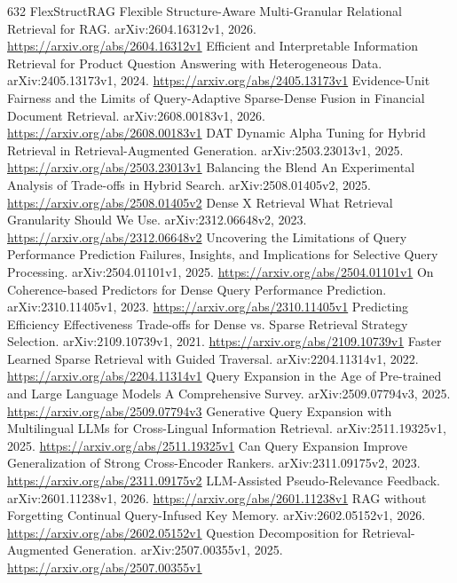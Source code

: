 \documentclass[11pt]{article}
\begin{document}
\begin{thebibliography}{632}
 FlexStructRAG Flexible Structure-Aware Multi-Granular Relational Retrieval for RAG. arXiv:2604.16312v1, 2026. \url{https://arxiv.org/abs/2604.16312v1}
 Efficient and Interpretable Information Retrieval for Product Question Answering with Heterogeneous Data. arXiv:2405.13173v1, 2024. \url{https://arxiv.org/abs/2405.13173v1}
 Evidence-Unit Fairness and the Limits of Query-Adaptive Sparse-Dense Fusion in Financial Document Retrieval. arXiv:2608.00183v1, 2026. \url{https://arxiv.org/abs/2608.00183v1}
 DAT Dynamic Alpha Tuning for Hybrid Retrieval in Retrieval-Augmented Generation. arXiv:2503.23013v1, 2025. \url{https://arxiv.org/abs/2503.23013v1}
 Balancing the Blend An Experimental Analysis of Trade-offs in Hybrid Search. arXiv:2508.01405v2, 2025. \url{https://arxiv.org/abs/2508.01405v2}
 Dense X Retrieval What Retrieval Granularity Should We Use. arXiv:2312.06648v2, 2023. \url{https://arxiv.org/abs/2312.06648v2}
 Uncovering the Limitations of Query Performance Prediction Failures, Insights, and Implications for Selective Query Processing. arXiv:2504.01101v1, 2025. \url{https://arxiv.org/abs/2504.01101v1}
 On Coherence-based Predictors for Dense Query Performance Prediction. arXiv:2310.11405v1, 2023. \url{https://arxiv.org/abs/2310.11405v1}
 Predicting Efficiency Effectiveness Trade-offs for Dense vs. Sparse Retrieval Strategy Selection. arXiv:2109.10739v1, 2021. \url{https://arxiv.org/abs/2109.10739v1}
 Faster Learned Sparse Retrieval with Guided Traversal. arXiv:2204.11314v1, 2022. \url{https://arxiv.org/abs/2204.11314v1}
 Query Expansion in the Age of Pre-trained and Large Language Models A Comprehensive Survey. arXiv:2509.07794v3, 2025. \url{https://arxiv.org/abs/2509.07794v3}
 Generative Query Expansion with Multilingual LLMs for Cross-Lingual Information Retrieval. arXiv:2511.19325v1, 2025. \url{https://arxiv.org/abs/2511.19325v1}
 Can Query Expansion Improve Generalization of Strong Cross-Encoder Rankers. arXiv:2311.09175v2, 2023. \url{https://arxiv.org/abs/2311.09175v2}
 LLM-Assisted Pseudo-Relevance Feedback. arXiv:2601.11238v1, 2026. \url{https://arxiv.org/abs/2601.11238v1}
 RAG without Forgetting Continual Query-Infused Key Memory. arXiv:2602.05152v1, 2026. \url{https://arxiv.org/abs/2602.05152v1}
 Question Decomposition for Retrieval-Augmented Generation. arXiv:2507.00355v1, 2025. \url{https://arxiv.org/abs/2507.00355v1}

\end{thebibliography}
\end{document}
